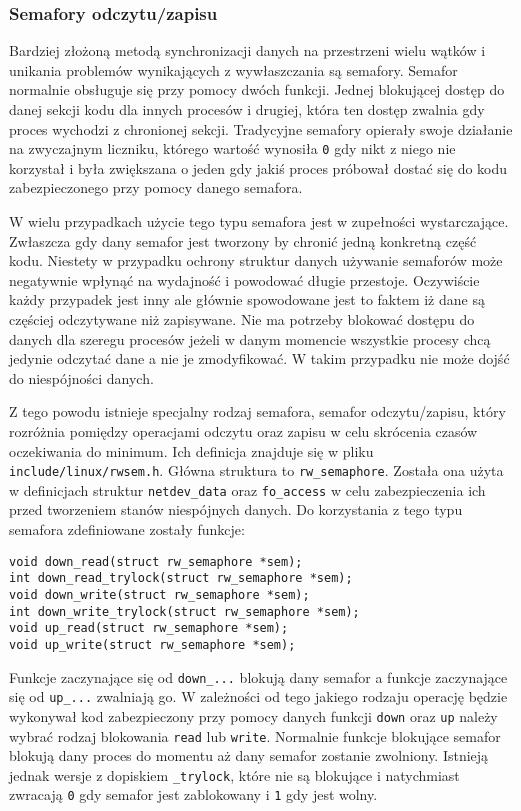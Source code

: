 \subsubsection{Semafory odczytu/zapisu}

Bardziej złożoną metodą synchronizacji danych na przestrzeni wielu
wątków i unikania problemów wynikających z wywłaszczania są semafory.
Semafor normalnie obsługuje się przy pomocy dwóch funkcji. Jednej
blokującej dostęp do danej sekcji kodu dla innych procesów i drugiej,
która ten dostęp zwalnia gdy proces wychodzi z chronionej sekcji.
Tradycyjne semafory opierały swoje działanie na zwyczajnym liczniku,
którego wartość wynosiła \texttt{0} gdy nikt z niego nie korzystał i
była zwiększana o jeden gdy jakiś proces próbował dostać się do kodu
zabezpieczonego przy pomocy danego semafora.

W wielu przypadkach użycie tego typu semafora jest w zupełności
wystarczające. Zwłaszcza gdy dany semafor jest tworzony by chronić jedną
konkretną część kodu. Niestety w przypadku ochrony struktur danych
używanie semaforów może negatywnie wpłynąć na wydajność i powodować
długie przestoje. Oczywiście każdy przypadek jest inny ale głównie
spowodowane jest to faktem iż dane są częściej odczytywane niż
zapisywane. Nie ma potrzeby blokować dostępu do danych dla szeregu
procesów jeżeli w danym momencie wszystkie procesy chcą jedynie odczytać
dane a nie je zmodyfikować. W takim przypadku nie może dojść do
niespójności danych.

Z tego powodu istnieje specjalny rodzaj semafora, semafor
odczytu/zapisu, który rozróżnia pomiędzy operacjami odczytu oraz zapisu
w celu skrócenia czasów oczekiwania do minimum. Ich definicja znajduje
się w pliku \texttt{include/linux/rwsem.h}. Główna struktura to
\texttt{rw\_semaphore}. Została ona użyta w definicjach struktur
\texttt{netdev\_data} oraz \texttt{fo\_access} w celu zabezpieczenia ich
przed tworzeniem stanów niespójnych danych. Do korzystania z tego typu
semafora zdefiniowane zostały funkcje:

\begin{verbatim}
void down_read(struct rw_semaphore *sem);
int down_read_trylock(struct rw_semaphore *sem);
void down_write(struct rw_semaphore *sem);
int down_write_trylock(struct rw_semaphore *sem);
void up_read(struct rw_semaphore *sem);
void up_write(struct rw_semaphore *sem);
\end{verbatim}

Funkcje zaczynające się od \texttt{down\_...} blokują dany semafor a
funkcje zaczynające się od \texttt{up\_...} zwalniają go. W zależności
od tego jakiego rodzaju operację będzie wykonywał kod zabezpieczony przy
pomocy danych funkcji \texttt{down} oraz \texttt{up} należy wybrać
rodzaj blokowania \texttt{read} lub \texttt{write}. Normalnie funkcje
blokujące semafor blokują dany proces do momentu aż dany semafor
zostanie zwolniony. Istnieją jednak wersje z dopiskiem
\texttt{\_trylock}, które nie są blokujące i natychmiast zwracają
\texttt{0} gdy semafor jest zablokowany i \texttt{1} gdy jest wolny.

